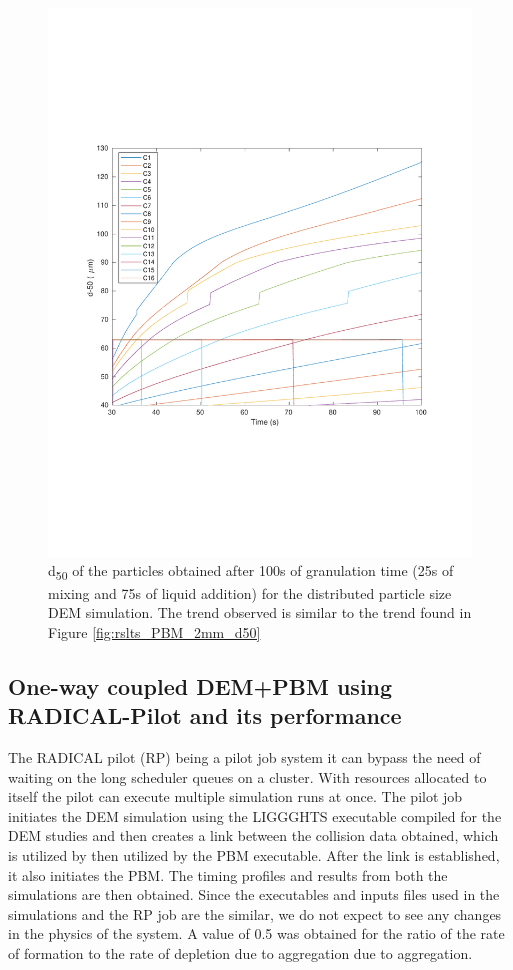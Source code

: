 \documentclass[preprint,11pt,authoryear]{elsarticle}
\begin{document}
\begin{figure}
\centering
\includegraphics[scale=0.5]{rslts_pbm_d50_128_555.pdf}
\caption{d\textsubscript{50} of the particles obtained after 100s of granulation time (25s of mixing and 75s of 
liquid addition) for the distributed particle size DEM simulation. The trend observed is similar to the trend 
found in Figure \ref{fig:rslts_PBM_2mm_d50}}
\label{fig:rslts_PBM_psd_d50}
\end{figure}


\subsection{One-way coupled DEM+PBM using RADICAL-Pilot and its performance} 
The RADICAL pilot (RP) being a pilot job system it can bypass the need of waiting on the long scheduler
queues on a cluster. With resources allocated to itself the pilot can execute multiple simulation runs 
at once. The pilot job initiates the DEM simulation using the LIGGGHTS executable compiled for the DEM
studies and then creates a link between the collision data obtained, which is utilized by then utilized 
by the PBM executable. After the link is established, it also initiates the PBM. The timing profiles and
results from both the simulations are then obtained. Since the executables and inputs files used in the 
simulations and the RP job are the similar, we do not expect to see any changes in the physics of the 
system. A value of 0.5 was obtained for the ratio of the rate of formation to the rate of depletion due to aggregation
due to aggregation.
\end{document}
